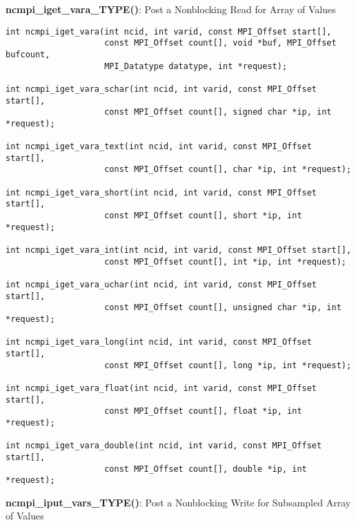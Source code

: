 {\bf ncmpi\_iget\_vara\_TYPE()}: Post a Nonblocking Read for Array of Values

\begin{verbatim}
int ncmpi_iget_vara(int ncid, int varid, const MPI_Offset start[],
                    const MPI_Offset count[], void *buf, MPI_Offset bufcount,
                    MPI_Datatype datatype, int *request); 

int ncmpi_iget_vara_schar(int ncid, int varid, const MPI_Offset start[],
                    const MPI_Offset count[], signed char *ip, int *request); 

int ncmpi_iget_vara_text(int ncid, int varid, const MPI_Offset start[],
                    const MPI_Offset count[], char *ip, int *request); 

int ncmpi_iget_vara_short(int ncid, int varid, const MPI_Offset start[],
                    const MPI_Offset count[], short *ip, int *request); 

int ncmpi_iget_vara_int(int ncid, int varid, const MPI_Offset start[],
                    const MPI_Offset count[], int *ip, int *request); 

int ncmpi_iget_vara_uchar(int ncid, int varid, const MPI_Offset start[],
                    const MPI_Offset count[], unsigned char *ip, int *request);

int ncmpi_iget_vara_long(int ncid, int varid, const MPI_Offset start[],
                    const MPI_Offset count[], long *ip, int *request);

int ncmpi_iget_vara_float(int ncid, int varid, const MPI_Offset start[],
                    const MPI_Offset count[], float *ip, int *request); 

int ncmpi_iget_vara_double(int ncid, int varid, const MPI_Offset start[],
                    const MPI_Offset count[], double *ip, int *request);
\end{verbatim}


{\bf ncmpi\_iput\_vars\_TYPE()}: Post a Nonblocking Write for Subsampled Array of Values

